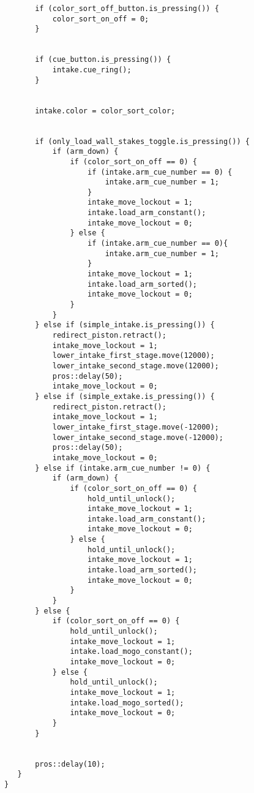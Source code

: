 \begin{verbatim}
       if (color_sort_off_button.is_pressing()) {
           color_sort_on_off = 0;
       }


       if (cue_button.is_pressing()) {
           intake.cue_ring();
       }


       intake.color = color_sort_color;


       if (only_load_wall_stakes_toggle.is_pressing()) {
           if (arm_down) {
               if (color_sort_on_off == 0) {
                   if (intake.arm_cue_number == 0) {
                       intake.arm_cue_number = 1;
                   }
                   intake_move_lockout = 1;
                   intake.load_arm_constant();
                   intake_move_lockout = 0;
               } else {
                   if (intake.arm_cue_number == 0){
                       intake.arm_cue_number = 1;
                   }
                   intake_move_lockout = 1;
                   intake.load_arm_sorted();
                   intake_move_lockout = 0;
               }
           }
       } else if (simple_intake.is_pressing()) {
           redirect_piston.retract();
           intake_move_lockout = 1;
           lower_intake_first_stage.move(12000);
           lower_intake_second_stage.move(12000);
           pros::delay(50);
           intake_move_lockout = 0;
       } else if (simple_extake.is_pressing()) {
           redirect_piston.retract();
           intake_move_lockout = 1;
           lower_intake_first_stage.move(-12000);
           lower_intake_second_stage.move(-12000);
           pros::delay(50);
           intake_move_lockout = 0;
       } else if (intake.arm_cue_number != 0) {
           if (arm_down) {
               if (color_sort_on_off == 0) {
                   hold_until_unlock();
                   intake_move_lockout = 1;
                   intake.load_arm_constant();
                   intake_move_lockout = 0;
               } else {
                   hold_until_unlock();
                   intake_move_lockout = 1;
                   intake.load_arm_sorted();
                   intake_move_lockout = 0;
               }
           }
       } else {
           if (color_sort_on_off == 0) {
               hold_until_unlock();
               intake_move_lockout = 1;
               intake.load_mogo_constant();
               intake_move_lockout = 0;
           } else {
               hold_until_unlock();
               intake_move_lockout = 1;
               intake.load_mogo_sorted();
               intake_move_lockout = 0;
           }
       }


       pros::delay(10);
   }
}



\end{verbatim}
